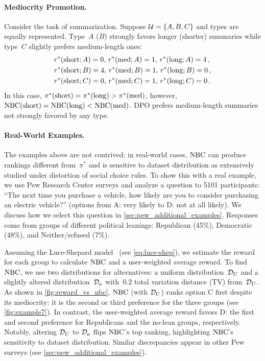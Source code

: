 \paragraph{Mediocrity Promotion.}
Consider the task of summarization. Suppose ${\mathcal{U}} = \{A, B, C\}$ and types are equally represented. Type~$A$ ($B$) strongly favors longer (shorter) summaries while type~$C$ slightly prefers medium-length ones:
%
\begin{align*}
    &r^*({\rm short}; A) = 0,\, r^*({\rm med}; A) = 1,\, r^*({\rm long}; A) = 4 \,, \\
    &r^*({\rm short}; B) = 4,\, r^*({\rm med}; B) = 1,\, r^*({\rm long}; B) = 0 \,, \\
    &r^*({\rm short}; C) = 0,\, r^*({\rm med}; C) = 1,\, r^*({\rm long}; C) = 0 \,.
\end{align*}
%
In this case,
$\pi^*({\rm short}) = \pi^*({\rm long}) > \pi^*({\rm med})$, however, ${\rm NBC}({\rm short}) = {\rm NBC}({\rm long}) < {\rm NBC}({\rm med})$. DPO prefers medium-length summaries not strongly favored by any type.


\paragraph{Real-World Examples.}
The examples above are not contrived; in real-world cases, ${\rm NBC}$ can produce rankings different from~$\pi^*$ and is sensitive to dataset distribution as extensively studied under distortion of social choice rules. To show this with a real example, we use Pew Research Center surveys and analyze a question to 5101 participants: ``The next time you purchase a vehicle, how likely are you to consider purchasing an electric vehicle?''
(options from A: very likely to D: not at all likely). We discuss how we select this question in \cref{sec:pew_additional_examples}. Responses come from groups of different political leanings: Republican (45\%), Democratic (48\%), and Neither/refused (7\%).

Assuming the Luce-Shepard model~\citep{shepard_stimulus_1957} (see \cref{eq:luce-shep}), we estimate the reward for each group to calculate ${\rm NBC}$ and a user-weighted average reward. To find ${\rm NBC}$, we use two distributions for alternatives: a uniform distribution~${\mathcal{D}}_U$ and a slightly altered distribution~${\mathcal{D}}_a$ with~$0.2$ total variation distance (TV) from~${\mathcal{D}}_U$. As shown in \cref{fig:reward_vs_nbc}, ${\rm NBC}$ (with ${\mathcal{D}}_U$) ranks option C first despite its mediocrity: it is the second or third preference for the three groups (see \cref{fig:example7}). In contrast, the user-weighted average reward favors D: the first and second preference for Republicans and the no-lean groups, respectively.
%
Notably, altering ${\mathcal{D}}_U$ to ${\mathcal{D}}_a$ flips ${\rm NBC}$’s top ranking, highlighting ${\rm NBC}$’s sensitivity to dataset distribution. Similar discrepancies appear in other Pew surveys (see \cref{sec:pew_additional_examples}).

